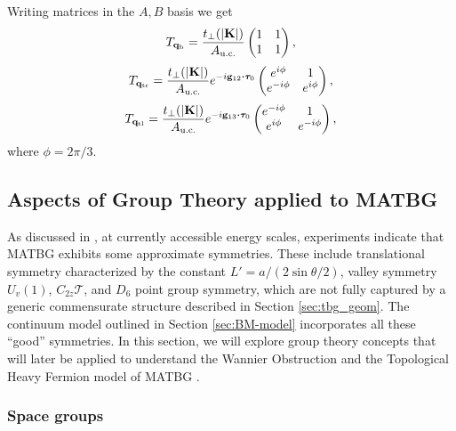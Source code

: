 \documentclass[12pt]{report}
\begin{document}
Writing matrices in the $A, B$ basis we get
\begin{equation} \label{eq:T-qb}
T_{{\vb{q}}_\text{b}} = \frac{t_\perp(\abs{\vb{K}})}{A_{\text{u.c.}}}
\begin{pmatrix}
1 & 1 \\
1 & 1
\end{pmatrix},
\end{equation}
\begin{equation} \label{eq:T-qtr}
T_{\q_\text{tr}} = \frac{t_\perp(\abs{\K})}{A_{\text{u.c.}}} e^{-i \g_{12} \vdot \vtau_0}
\begin{pmatrix}
e^{i\phi} & 1 \\
e^{-i\phi} & e^{i\phi}
\end{pmatrix},
\end{equation}
\begin{equation} \label{eq:T-qtl}
T_{\q_\text{tl}} = \frac{t_\perp(\abs{\K})}{A_{\text{u.c.}}} e^{-i \g_{13} \vdot \vtau_0}
\begin{pmatrix}
e^{-i\phi} & 1 \\
e^{i\phi} & e^{-i\phi}
\end{pmatrix},
\end{equation}
where $\phi = 2\pi/3$.


\subsection{Aspects of Group Theory applied to MATBG} \label{sec:grouptheory}

As discussed in \cite{zou2018}, at currently accessible energy scales, experiments indicate that MATBG exhibits some approximate symmetries. These include translational symmetry characterized by the constant $L' = a / (2 \sin\theta/2)$, valley symmetry $U_v(1)$, $C_{2z} \mathcal{T}$, and $D_6$ point group symmetry, which are not fully captured by a generic commensurate structure described in Section \ref{sec:tbg_geom}. The continuum model outlined in Section \ref{sec:BM-model} incorporates all these ``good'' symmetries. In this section, we will explore group theory concepts that will later be applied to understand the Wannier Obstruction \cite{zou2018} and the Topological Heavy Fermion model of MATBG \cite{topoheavyfermion2022}.

\subsubsection{Space groups} \label{sec:spacegroups}
\end{document}
